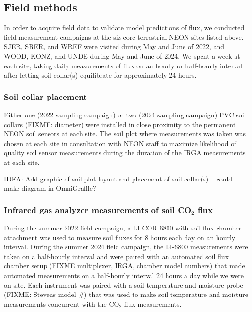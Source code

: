 \documentclass[
  letterpaper,
  DIV=11,
  numbers=noendperiod]{scrartcl}
\begin{document}
\normalsize

\subsection{Field methods}\label{field-methods}

In order to acquire field data to validate model predictions of flux, we
conducted field measurement campaigns at the siz core terrestrial NEON
sites listed above. SJER, SRER, and WREF were visited during May and
June of 2022, and WOOD, KONZ, and UNDE during May and June of 2024. We
spent a week at each site, taking daily measurements of flux on an
hourly or half-hourly interval after letting soil collar(s) equilibrate
for approximately 24 hours.

\subsubsection{Soil collar placement}\label{soil-collar-placement}

Either one (2022 sampling campaign) or two (2024 sampling campaign) PVC
soil collars (FIXME: diameter) were installed in close proximity to the
permanent NEON soil sensors at each site. The soil plot where
measurements was taken was chosen at each site in consultation with NEON
staff to maximize likelihood of quality soil sensor measurements during
the duration of the IRGA measurements at each site.

IDEA: Add graphic of soil plot layout and placement of soil collar(s) --
could make diagram in OmniGraffle?

\subsubsection{\texorpdfstring{Infrared gas analyzer measurements of
soil CO\(_{2}\)
flux}{Infrared gas analyzer measurements of soil CO\_\{2\} flux}}\label{infrared-gas-analyzer-measurements-of-soil-co_2-flux}

During the summer 2022 field campaign, a LI-COR 6800 with soil flux
chamber attachment was used to measure soil fluxes for 8 hours each day
on an hourly interval. During the summer 2024 field campaign, the
LI-6800 measurements were taken on a half-hourly interval and were
paired with an automated soil flux chamber setup (FIXME multiplexer,
IRGA, chamber model numbers) that made automated measurements on a
half-hourly interval 24 hours a day while we were on site. Each
instrument was paired with a soil temperature and moisture probe (FIXME:
Stevens model \#) that was used to make soil temperature and moisture
measurements concurrent with the CO\(_{2}\) flux measurements.
\end{document}
